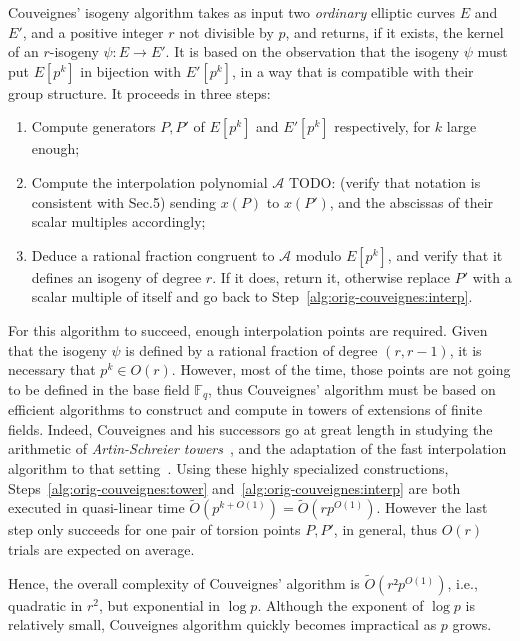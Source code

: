 \documentclass{lms}
\newcommand{\todo}[1]{{\color{red}TODO: #1}}
\newcommand{\F}{\mathbb{F}}
\newcommand{\tildO}{\tilde{O}}
\begin{document}
Couveignes' isogeny algorithm takes as input two \emph{ordinary}
elliptic curves $E$ and $E'$, and a positive integer $r$ not
divisible by $p$, and returns, if it exists, the kernel of an
$r$-isogeny $ψ:E\to E'$. It is based on the observation that the
isogeny $ψ$ must put $E[p^k]$ in bijection with $E'[p^k]$, in a way
that is compatible with their group structure. It proceeds in three
steps:
\begin{enumerate}
\item\label{alg:orig-couveignes:tower} Compute generators $P,P'$ of
  $E[p^k]$ and $E'[p^k]$ respectively, for $k$ large enough;
\item\label{alg:orig-couveignes:interp} Compute the interpolation
  polynomial $\mathcal{A}$ \todo{(verify that notation is consistent
    with Sec.5)} sending $x(P)$ to $x(P')$, and the abscissas of
  their scalar multiples accordingly;
\item\label{alg:orig-couveignes:rational} Deduce a rational fraction
  congruent to $\mathcal{A}$ modulo $E[p^k]$, and verify that it
  defines an isogeny of degree $r$. If it does, return it, otherwise
  replace $P'$ with a scalar multiple of itself and go back to
  Step~\ref{alg:orig-couveignes:interp}.
\end{enumerate}

For this algorithm to succeed, enough interpolation points are
required. Given that the isogeny $ψ$ is defined by a rational fraction
of degree $(r,r-1)$, it is necessary that $p^k∈O(r)$. However, most of
the time, those points are not going to be defined in the base field
$\F_q$, thus Couveignes' algorithm must be based on efficient
algorithms to construct and compute in towers of extensions of finite
fields. Indeed, Couveignes and his successors go at great length in
studying the arithmetic of \emph{Artin-Schreier
  towers}~\cite{couveignes00,df+schost12}, and the adaptation of the
fast interpolation algorithm to that setting~\cite{df10}.  Using these
highly specialized constructions,
Steps~\ref{alg:orig-couveignes:tower}
and~\ref{alg:orig-couveignes:interp} are both executed in quasi-linear
time $\tildO(p^{k+O(1)})=\tildO(rp^{O(1)})$. However the last step
only succeeds for one pair of torsion points $P,P'$, in general, thus
$O(r)$ trials are expected on average.

Hence, the overall complexity of Couveignes' algorithm is
$\tildO(r²p^{O(1)})$, i.e., quadratic in $r^2$, but exponential in
$\log p$. Although the exponent of $\log p$ is relatively small, Couveignes
algorithm quickly becomes impractical as $p$ grows.
\end{document}
